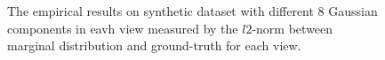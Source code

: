 \documentclass[11pt]{article}
\begin{document}
\begin{figure}
\caption{The empirical results on synthetic dataset with different 8 Gaussian components in eavh view measured by the $l2$-norm between marginal distribution and ground-truth for each view.}
\end{figure}
\end{document}
